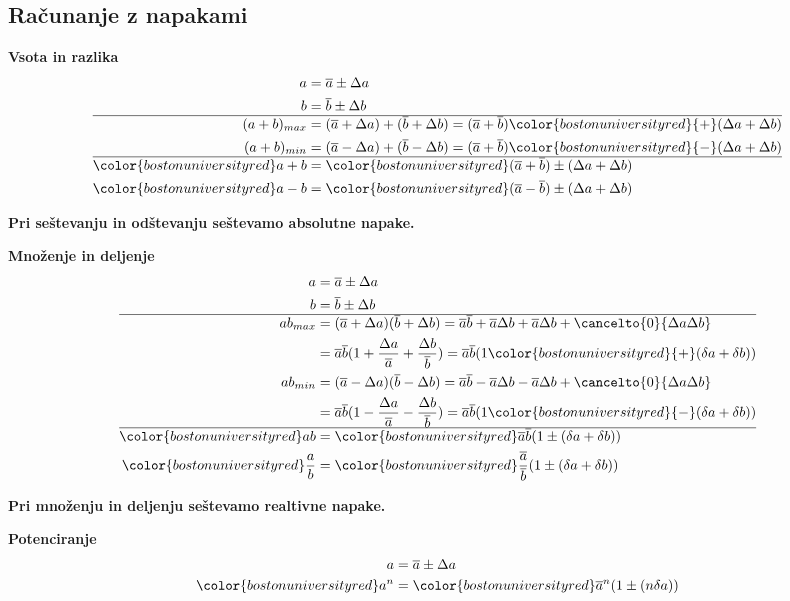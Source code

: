 {\color{indiagreen}\subsection{Računanje z napakami}}
\textbf{Vsota in razlika}
\begin{align*}
	a &= \overline{a} \pm \Delta a\\
	b &= \overline{b} \pm \Delta b\\
	\hline
	(a+b)_{max} &= (\overline{a} + \Delta a) + (\overline{b} + \Delta b) = (\overline{a} + \overline{b}) {\color{bostonuniversityred}{+}} (\Delta{a} + \Delta{b})\\
	(a+b)_{min} &= (\overline{a} - \Delta a) + (\overline{b} - \Delta b) = (\overline{a} + \overline{b}) {\color{bostonuniversityred}{-}} (\Delta{a} + \Delta{b})\\
	\hline
	\color{bostonuniversityred} a + b &= \color{bostonuniversityred} (\overline{a} + \overline{b}) \pm (\Delta{a} + \Delta{b})\\
	\color{bostonuniversityred} a - b &= \color{bostonuniversityred} (\overline{a} - \overline{b}) \pm (\Delta{a} + \Delta{b})\\
\end{align*}

\textbf{Pri seštevanju in odštevanju seštevamo absolutne napake.}

\textbf{Množenje in deljenje}
\begin{align*}
	a &= \overline{a} \pm \Delta a\\
	b &= \overline{b} \pm \Delta b\\
	\hline
	ab_{max} &= (\overline{a} + \Delta a)(\overline{b} + \Delta b) = \overline{a}\overline{b} + \overline{a}\Delta b + \overline{a}\Delta b + {\cancelto{0}{\Delta a \Delta b}}\\
	&= \overline{a}\overline{b}(1 + \frac{\Delta a}{\overline{a}} + \frac{\Delta b}{\overline{b}}) = \overline{a}\overline{b}(1 {\color{bostonuniversityred}{+}} (\delta a + \delta b))\\
	ab_{min} &= (\overline{a} - \Delta a)(\overline{b} - \Delta b) = \overline{a}\overline{b} - \overline{a}\Delta b - \overline{a}\Delta b + {\cancelto{0}{\Delta a \Delta b}}\\
	&= \overline{a}\overline{b}(1 - \frac{\Delta a}{\overline{a}} - \frac{\Delta b}{\overline{b}}) = \overline{a}\overline{b}(1 {\color{bostonuniversityred}{-}} (\delta a + \delta b))\\
	\hline
	\color{bostonuniversityred} ab &= \color{bostonuniversityred} \overline{a}\overline{b}(1 \pm (\delta{a} + \delta{b}))\\
	\color{bostonuniversityred} \frac{a}{b} &= \color{bostonuniversityred} \frac{\overline{a}}{\overline{b}}(1 \pm (\delta{a} + \delta{b}))\\
\end{align*}

\textbf{Pri množenju in deljenju seštevamo realtivne napake.}

\textbf{Potenciranje}
\begin{align*}
	a &= \overline{a} \pm \Delta a\\
	\color{bostonuniversityred} a^n &= \color{bostonuniversityred} \overline{a}^n (1 \pm (n\delta{a}))\\
\end{align*}